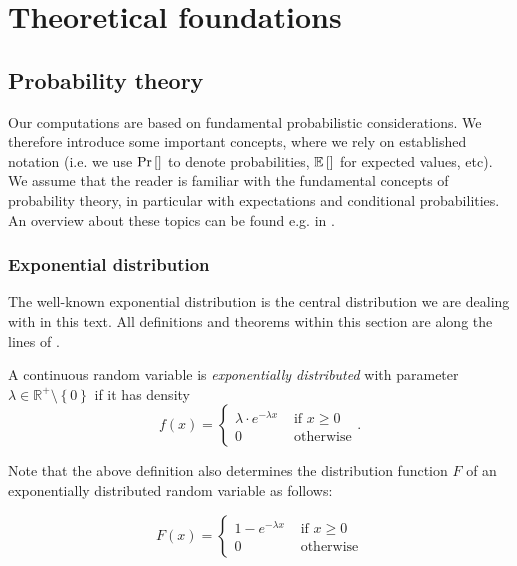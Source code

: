 \chapter{Theoretical foundations}
\label{chap:theoretical-foundations}

\section{Probability theory}
\label{sec:some-probability}

Our computations are based on fundamental probabilistic considerations. We therefore introduce some important concepts, where we rely on established notation (i.e. we use $\operatorname{Pr}\left[\right]$ to denote probabilities, $\mathbb{E}\left[  \right]$ for expected values, etc). We assume that the reader is familiar with the fundamental concepts of probability theory, in particular with expectations and conditional probabilities. An overview about these topics can be found e.g. in \cite{schickinger2001diskrete}.

\subsection{Exponential distribution}
\label{sec:exponential-distribution}

The well-known exponential distribution is the central distribution we are dealing with in this text. All definitions and theorems within this section are along the lines of \cite{schickinger2001diskrete}.

\begin{definition}
  A continuous random variable is \emph{exponentially distributed} with parameter $\lambda \in \mathbb{R}^+\setminus \left\{ 0 \right\}$ if it has density 
  \begin{equation*}
    f(x) =
    \begin{cases}
      \lambda \cdot e^{-\lambda x} & \text{ if } x \geq 0 
      \\ 0 & \text{ otherwise}
    \end{cases}
    .
  \end{equation*}
\end{definition}

Note that the above definition also determines the distribution function $F$ of an exponentially distributed random variable as follows:

\begin{equation*}
  F(x) =
  \begin{cases}
    1-e^{-\lambda x} & \text{ if } x \geq 0 \\
    0 & \text{ otherwise}
  \end{cases}
\end{equation*}

